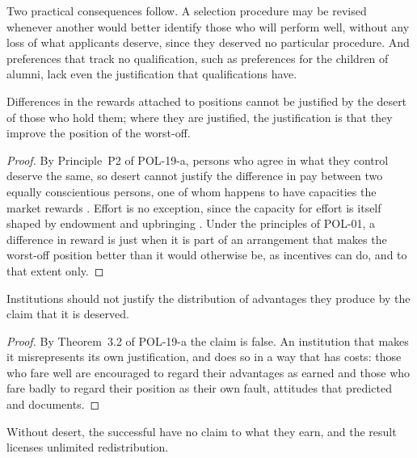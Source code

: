 \documentclass{situationist-preprint}
\begin{document}
Two practical consequences follow. A selection procedure may be revised whenever another would better identify those who will perform well, without any loss of what applicants deserve, since they deserved no particular procedure. And preferences that track no qualification, such as preferences for the children of alumni, lack even the justification that qualifications have.

\begin{proposition}\label{p:rewards}
Differences in the rewards attached to positions cannot be justified by the desert of those who hold them; where they are justified, the justification is that they improve the position of the worst-off.
\end{proposition}

\begin{proof}
By Principle~P2 of POL-19-a, persons who agree in what they control deserve the same, so desert cannot justify the difference in pay between two equally conscientious persons, one of whom happens to have capacities the market rewards \citep{Frank2016}. Effort is no exception, since the capacity for effort is itself shaped by endowment and upbringing \citep[\S12]{Rawls1971}. Under the principles of POL-01, a difference in reward is just when it is part of an arrangement that makes the worst-off position better than it would otherwise be, as incentives can do, and to that extent only.
\end{proof}

\begin{proposition}\label{p:rhetoric}
Institutions should not justify the distribution of advantages they produce by the claim that it is deserved.
\end{proposition}

\begin{proof}
By Theorem~3.2 of POL-19-a the claim is false. An institution that makes it misrepresents its own justification, and does so in a way that has costs: those who fare well are encouraged to regard their advantages as earned and those who fare badly to regard their position as their own fault, attitudes that \citet{Young1958} predicted and \citet{Sandel2020} documents.
\end{proof}

\begin{objection}
Without desert, the successful have no claim to what they earn, and the result licenses unlimited redistribution.
\end{objection}
\end{document}

